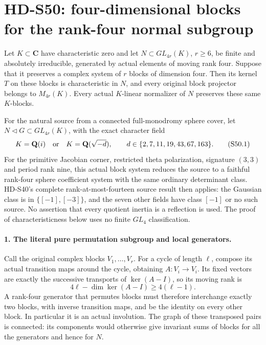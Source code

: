 \section{HD-S50: four-dimensional blocks for the rank-four normal subgroup}
\label{sec:four-block-kernel-scope}

Let \(K\subset\mathbf C\) have characteristic zero and let
\(N\subset GL_{4r}(K)\), \(r\ge6\), be finite and
absolutely irreducible, generated by actual elements of moving
rank four. Suppose that it preserves a complex system of
\(r\) blocks of dimension four. Then its kernel \(T\) on
these blocks is characteristic in \(N\), and every original
block projector belongs to \(M_{4r}(K)\). Every actual
\(K\)-linear normalizer of \(N\) preserves these same
\(K\)-blocks.

For the natural source from a connected full-monodromy sphere
cover, let
\(N\triangleleft G\subset GL_{4r}(K)\), with the exact
character field
\[
 K=\mathbf Q(i)\quad\hbox{or}\quad
 K=\mathbf Q(\sqrt{-d}),\qquad
 d\in\{2,7,11,19,43,67,163\}.                           \tag{S50.1}
\]
For the primitive Jacobian corner, restricted theta polarization,
signature \((3,3)\) and period rank nine, this actual block
system reduces the source to a faithful rank-four sphere
coefficient system with the same ordinary determinant class.
HD-S40's complete rank-at-most-fourteen source result then
applies: the Gaussian class is in \(\{[-1],[-3]\}\),
and the seven other fields have class \([-1]\) or no such
source. No assertion that every quotient inertia is a reflection
is used. The proof of characteristicness below uses no finite
\(GL_4\) classification.

\paragraph{1. The literal pure permutation subgroup and local generators.}
Call the original complex blocks \(V_1,\ldots,V_r\).
For a cycle of length \(\ell\), compose its actual
transition maps around the cycle, obtaining \(A:V_i\to V_i\).
Its fixed vectors are exactly the successive transports of
\(\ker(A-I)\), so its moving rank is
\[
             4\ell-\dim\ker(A-I)\ge4(\ell-1).
                                                               \tag{S50.2}
\]
A rank-four generator that permutes blocks must therefore
interchange exactly two blocks, with inverse transition maps,
and be the identity on every other block. In particular it is
an actual involution. The graph of these transposed pairs is
connected: its components would otherwise give invariant sums
of blocks for all the generators and hence for \(N\).

